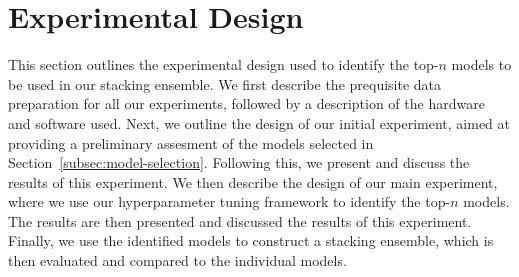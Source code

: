 \section{Experimental Design}\label{sec:methodology}
This section outlines the experimental design used to identify the top-$n$ models to be used in our stacking ensemble.
We first describe the prequisite data preparation for all our experiments, followed by a description of the hardware and software used.
Next, we outline the design of our initial experiment, aimed at providing a preliminary assesment of the models selected in Section~\ref{subsec:model-selection}.
Following this, we present and discuss the results of this experiment.
We then describe the design of our main experiment, where we use our hyperparameter tuning framework to identify the top-$n$ models.
The results are then presented and discussed the results of this experiment.
Finally, we use the identified models to construct a stacking ensemble, which is then evaluated and compared to the individual models.



